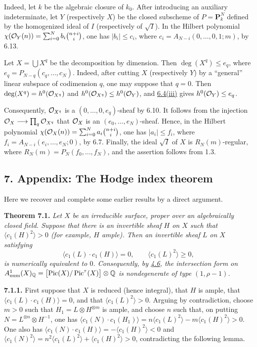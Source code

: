 Indeed, let $k$ be the algebraic closure of $k_0$. After introducing an
auxiliary indeterminate, let $Y$ (respectively $X$) be the closed
subscheme of $P=\mathbf P^N_k$ defined by the homogenized ideal of $I$
(respectively of $\sqrt I$). In the Hilbert polynomial
$\chi(\mathcal O_Y(n))=\sum_{i=0}^{N}b_i\binom{n+i}{i}$, one has
$|b_i|\leq c_i$, where $c_i=A_{N-i}(0,\ldots,0,1;m)$, by 6.13.

Let $X=\bigcup X^q$ be the decomposition by dimension. Then
$\deg(X^q)\leq e_q$, where $e_q=P_{N-q}(c_q,\ldots,c_N)$.
Indeed, after cutting $X$ (respectively $Y$) by a ``general'' linear subspace of codimension $q$, one may suppose that $q=0$. Then
$\deg(X^q)=h^0(\mathcal O_{X^q})$ and
$h^0(\mathcal O_{X^q})\leq h^0(\mathcal O_Y)$, and \hyperlink{sga6.e13.thm.6-4}{6.4(iii)} gives
$h^0(\mathcal O_Y)\leq e_q$.

Consequently, $\mathcal O_{X^q}$ is a $(0,\ldots,0,e_q)$-sheaf by 6.10. It
follows from the injection $\mathcal O_X\longrightarrow\prod_q\mathcal O_{X^q}$ that
$\mathcal O_X$ is an $(e_0,\ldots,e_N)$-sheaf. Hence, in the Hilbert polynomial
$\chi(\mathcal O_X(n))=\sum_{i=0}^{N}a_i\binom{n+i}{i}$, one has
$|a_i|\leq f_i$, where $f_i=A_{N-i}(e_i,\ldots,e_N;0)$, by 6.7.
Finally, the ideal $\sqrt I$ of $X$ is $R_N(m)$-regular, where
$R_N(m)=P_N(f_0,\ldots,f_N)$, and the assertion follows from 1.3.

\subsection*{7. Appendix: The Hodge index theorem}

Here we recover and complete some earlier results by a direct argument.

\textbf{Theorem 7.1.} \emph{Let $X$ be an irreducible surface, proper
over an algebraically closed field. Suppose that there is an invertible
sheaf $H$ on $X$ such that $\langle c_1(H)^2\rangle>0$ (for example,
$H$ ample). Then an invertible sheaf $L$ on $X$ satisfying
\[
  \langle c_1(L)\cdot c_1(H)\rangle=0,
  \qquad
  \langle c_1(L)^2\rangle\geq0,
\]
is numerically equivalent to $0$. Consequently, by \hyperlink{sga6.e13.thm.4-6}{4.6}, the intersection
form on $A^1_{\mathrm{num}}(X)_{\mathbb Q}
=\bigl[\operatorname{Pic}(X)/\operatorname{Pic}^\tau(X)\bigr]\otimes\mathbb Q$ is nondegenerate of type
$(1,\rho-1)$.}

\textbf{7.1.1.} First suppose that $X$ is reduced (hence integral), that
$H$ is ample, that $\langle c_1(L)\cdot c_1(H)\rangle=0$, and that
$\langle c_1(L)^2\rangle>0$. Arguing by contradiction, choose $m>0$
such that $H_1=L\otimes H^{\otimes m}$ is ample, and choose $n$ such
that, on putting $N=L^{\otimes n}\otimes H^{-1}$, one has
$\langle c_1(N)\cdot c_1(H_1)\rangle
=n\langle c_1(L)^2\rangle-m\langle c_1(H)^2\rangle>0$. One also has
$\langle c_1(N)\cdot c_1(H)\rangle=-\langle c_1(H)^2\rangle<0$ and
$\langle c_1(N)^2\rangle
=n^2\langle c_1(L)^2\rangle+\langle c_1(H)^2\rangle>0$, contradicting
the following lemma.

